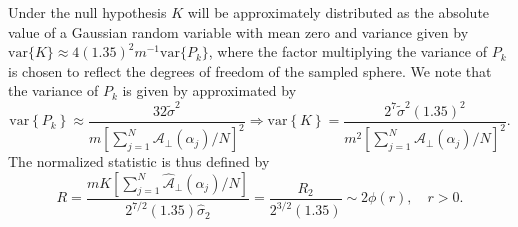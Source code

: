 \documentclass[dvips,aoas,preprint]{imsart}
\numberwithin{equation}{section}
\theoremstyle{plain}
\newcommand{\var}{\ensuremath{\text{var}}}
\newcommand{\cA}{\mathcal{A}}
\newcommand{\wh}[1]{\widehat{#1}}
\begin{document}
Under the null hypothesis $K$ will be approximately distributed as the
absolute value of a Gaussian random variable with mean zero and
variance given by $\var\{K\}\approx4(1.35)^2m^{-1}\var\{P_k\}$, where
the factor multiplying the variance of $P_k$ is chosen to reflect the
degrees of freedom of the sampled sphere.  We note that the variance
of $P_k$ is given by approximated by
\begin{equation}
  \var\left\{P_k\right\} \approx \frac{32\tilde\sigma^2}
    {m\left[\sum_{j=1}^N{\cA}_{\perp}\left(\alpha_j\right)/N\right]^2}
    \Rightarrow
    \var\left\{K\right\}=\frac{2^7\tilde\sigma^2(1.35)^2}
    {m^2\left[\sum_{j=1}^N{\cA}_{\perp}\left(\alpha_j\right)/N\right]^2}.
\end{equation}
The normalized statistic is thus defined by
\begin{equation}
  R = \frac{mK\left[\sum_{j=1}^N\wh{\cA}_{\perp}\left(\alpha_j\right)/N\right]}{2^{7/2}(1.35)\hat\sigma_2} = \frac{R_2}{2^{3/2}(1.35)} \sim 2\phi(r),\quad r>0.
\end{equation}



\end{document}
